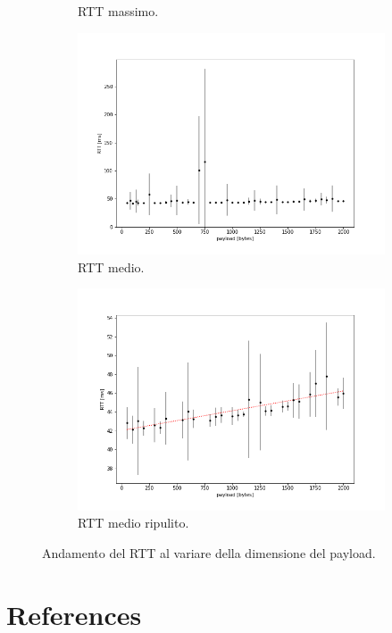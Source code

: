 \documentclass[a4paper,10pt]{article}
\begin{document}
\begin{figure}[h!]
\begin{subfigure}[b]{0.49\textwidth}
         \caption{RTT massimo.}
         \label{fig:rttmax}
     \end{subfigure}
     \hfill
     \begin{subfigure}[b]{0.49\textwidth}
         \centering
         \includegraphics[width=\textwidth]{img/avg.png}
         \caption{RTT medio.}
         \label{fig:rttavg}
     \end{subfigure}
     \hfill
     \begin{subfigure}[b]{0.49\textwidth}
         \centering
         \includegraphics[width=\textwidth]{img/clean_avg.png}
         \caption{RTT medio ripulito.}
         \label{fig:cleanrtt}
     \end{subfigure}
        \caption{Andamento del RTT al variare della dimensione del payload.}
        \label{fig:rttfig}
\end{figure}




\newpage

\section{References}
\printbibliography[heading=none]
\end{document}
